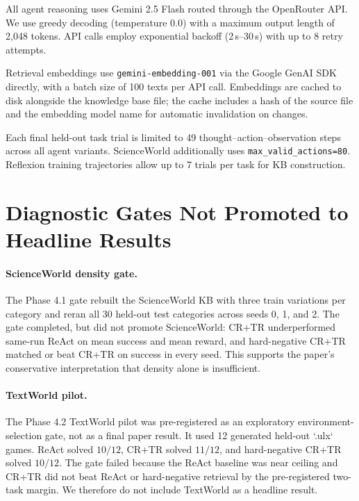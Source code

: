 All agent reasoning uses Gemini 2.5 Flash routed through the OpenRouter API. We use greedy decoding (temperature 0.0) with a maximum output length of 2{,}048 tokens. API calls employ exponential backoff (2\,s--30\,s) with up to 8 retry attempts.

Retrieval embeddings use \texttt{gemini-embedding-001} via the Google GenAI SDK directly, with a batch size of 100 texts per API call. Embeddings are cached to disk alongside the knowledge base file; the cache includes a hash of the source file and the embedding model name for automatic invalidation on changes.

Each final held-out task trial is limited to 49 thought--action--observation steps across all agent variants. ScienceWorld additionally uses \texttt{max\_valid\_actions=80}. Reflexion training trajectories allow up to 7 trials per task for KB construction.

\section{Diagnostic Gates Not Promoted to Headline Results}
\label{app:diagnostic-gates}

\paragraph{ScienceWorld density gate.}
The Phase 4.1 gate rebuilt the ScienceWorld KB with three train variations per category and reran all 30 held-out test categories across seeds 0, 1, and 2.
The gate completed, but did not promote ScienceWorld: CR+TR underperformed same-run ReAct on mean success and mean reward, and hard-negative CR+TR matched or beat CR+TR on success in every seed.
This supports the paper's conservative interpretation that density alone is insufficient.

\paragraph{TextWorld pilot.}
The Phase 4.2 TextWorld pilot was pre-registered as an exploratory environment-selection gate, not as a final paper result.
It used 12 generated held-out `.ulx` games. ReAct solved $10/12$, CR+TR solved $11/12$, and hard-negative CR+TR solved $10/12$.
The gate failed because the ReAct baseline was near ceiling and CR+TR did not beat ReAct or hard-negative retrieval by the pre-registered two-task margin.
We therefore do not include TextWorld as a headline result.
